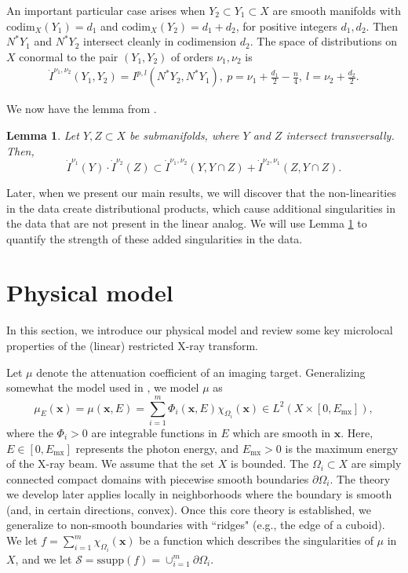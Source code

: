 \documentclass[11pt]{article}
\newcommand{\jc}[1]{\begin{quotation}\textbf{James' comment:\
}{\textit{#1}}\end{quotation}}
\newcommand{\ac}[1]{\begin{quotation}\textbf{Sasha's comment:\
}{\textit{#1}}\end{quotation}}
\newcommand{\be}{\begin{equation}}
\newcommand{\ee}{\end{equation}}
\newcommand{\s}{\mathcal S}
\newcommand{\q}{\nu}
\numberwithin{equation}{section}
\newcommand{\vx}{\mathbf{x}}
\newtheorem{lemma}[theorem]{Lemma}
\theoremstyle{definition}
\begin{document}
An important particular case arises when $Y_2 \subset Y_1 \subset X$ are smooth manifolds with $\text{codim}_X(Y_1) = d_1$ and $\text{codim}_X(Y_2) = d_1 + d_2$, for positive integers $d_1, d_2$. Then $N^*Y_1$ and $N^*Y_2$ intersect cleanly in codimension $d_2$. The space of distributions on $X$ conormal to the pair $(Y_1,Y_2)$ of orders $\q_1, \q_2$ is
\be\label{two types}
\begin{split}
\dot{I}^{\q_1,\q_2}(Y_1,Y_2)=I^{p,l}(N^*Y_2, N^* Y_1),\ p=\q_1 + \tfrac{d_1}{2}-\tfrac{n}{4},\ l=\q_2+\tfrac{d_2}{2}.
\end{split}
\ee

\noindent We now have the lemma from \cite[Lemma 1.1]{greenleaf1993recovering}.
\begin{lemma}
\label{lem_green}
Let $Y, Z \subset X$ be submanifolds, where $Y$ and $Z$ intersect transversally. Then, 
\be\label{prod distr}
\dot{I}^{\q_1}(Y)\cdot \dot{I}^{\q_2}(Z) \subset \dot{I}^{\q_1,\q_2}(Y,Y \cap Z)  + \dot{I}^{\nu_2,\q_1}(Z,Y \cap Z).
\ee
\end{lemma}
\noindent Later, when we present our main results, we will discover that the non-linearities in the data create distributional products, which cause additional singularities in the data that are not present in the linear analog. We will use Lemma \ref{lem_green} to quantify the strength of these added singularities in the data.


\section{Physical model}\label{phys_model}
In this section, we introduce our physical model and review some key microlocal properties of the (linear) restricted X-ray transform.

Let $\mu $ denote the attenuation coefficient of an imaging target. Generalizing somewhat the model used in \cite{katsevich2026}, we model $\mu$ as
\be
\label{mu_model}
\mu_E(\vx) = \mu(\vx,E) = \sum_{i = 1}^{m} \Phi_i(\vx,E) \chi_{\Omega_i}(\vx)\in L^2(X \times [0,E_{\mathrm{mx}}]),
\ee
where the $\Phi_i > 0$ are integrable functions in $E$ which are smooth in $\vx$.
Here, $E \in [0,E_{\mathrm{mx}}]$ represents the photon energy, and $E_{\mathrm{mx}} > 0$ is the maximum energy of the X-ray beam. We assume that the set $X$ is bounded. The $\Omega_i \subset X$ are simply connected compact domains with piecewise smooth boundaries $\partial \Omega_i$. The theory we develop later applies locally in neighborhoods where the boundary is smooth (and, in certain directions, convex). Once this core theory is established, we generalize to non-smooth boundaries with ``ridges" (e.g., the edge of a cuboid). We let $f = \sum_{i = 1}^{m} \chi_{\Omega_i}(\vx)$ be a function which describes the singularities of $\mu$ in $X$, and we let $\s = \text{ssupp}(f) = \cup_{i=1}^m \partial \Omega_i$.
\end{document}
